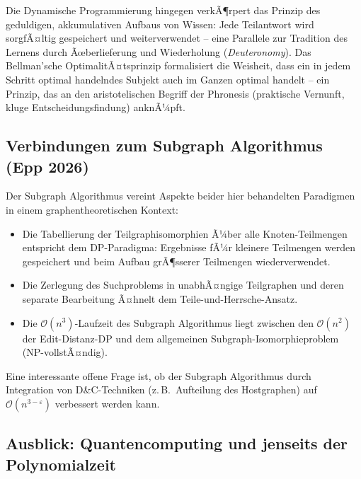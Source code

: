 ﻿\documentclass[a4paper,12pt]{article}
\theoremstyle{definition}
\begin{document}
Die Dynamische Programmierung hingegen verkÃ¶rpert das Prinzip des geduldigen,
akkumulativen Aufbaus von Wissen: Jede Teilantwort wird sorgfÃ¤ltig gespeichert
und weiterverwendet -- eine Parallele zur Tradition des Lernens durch
Ãœberlieferung und Wiederholung (\textit{Deuteronomy}). Das Bellman'sche
OptimalitÃ¤tsprinzip formalisiert die Weisheit, dass ein in jedem Schritt optimal
handelndes Subjekt auch im Ganzen optimal handelt -- ein Prinzip, das an den
aristotelischen Begriff der Phronesis (praktische Vernunft, kluge Entscheidungsfindung)
anknÃ¼pft.

\subsection{Verbindungen zum Subgraph Algorithmus (Epp 2026)}

Der Subgraph Algorithmus \cite{epp2026subgraph} vereint Aspekte beider hier
behandelten Paradigmen in einem graphentheoretischen Kontext:
\begin{itemize}
    \item Die Tabellierung der Teilgraphisomorphien Ã¼ber alle Knoten-Teilmengen
          entspricht dem DP-Paradigma: Ergebnisse fÃ¼r kleinere Teilmengen
          werden gespeichert und beim Aufbau grÃ¶sserer Teilmengen wiederverwendet.
    \item Die Zerlegung des Suchproblems in unabhÃ¤ngige Teilgraphen und deren
          separate Bearbeitung Ã¤hnelt dem Teile-und-Herrsche-Ansatz.
    \item Die $\mathcal{O}(n^3)$-Laufzeit des Subgraph Algorithmus liegt
          zwischen den $\mathcal{O}(n^2)$ der Edit-Distanz-DP und dem
          allgemeinen Subgraph-Isomorphieproblem (NP-vollstÃ¤ndig).
\end{itemize}

Eine interessante offene Frage ist, ob der Subgraph Algorithmus durch
Integration von D\&C-Techniken (z.\,B.\ Aufteilung des Hostgraphen) auf
$\mathcal{O}(n^{3-\varepsilon})$ verbessert werden kann.

\subsection{Ausblick: Quantencomputing und jenseits der Polynomialzeit}
\end{document}
